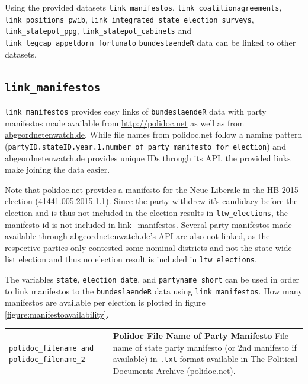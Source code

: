 \documentclass[
]{scrartcl}
\begin{document}
Using the provided datasets \texttt{link\_manifestos},
\texttt{link\_coalitionagreements}, \texttt{link\_positions\_pwib},
\texttt{link\_integrated\_state\_election\_surveys},
\texttt{link\_statepol\_ppg}, \texttt{link\_statepol\_cabinets} and
\texttt{link\_legcap\_appeldorn\_fortunato} \texttt{bundeslaendeR} data
can be linked to other datasets.

\subsection{\texorpdfstring{\texttt{link\_manifestos}}{link\_manifestos}}\label{link_manifestos}

\texttt{link\_manifestos} provides easy links of \texttt{bundeslaendeR}
data with party manifestos made available from \url{http://polidoc.net}
\parencites{benoitChallengesEstimatingPolicy2009}{grossDoesEURegional2018}{pappiPolitikpositionenDeutschenLandtagsparteien2014}{pappiPartyElectionProgrammes2009}[for the codebook see][]{brauningerPolidocnetCodebook2018}
as well as from \url{abgeordnetenwatch.de}. While file names from
polidoc.net follow a naming pattern
(\texttt{{partyID}.{stateID}.{year}.{1}.{number of party manifesto for election}})
and abgeordnetenwatch.de provides unique IDs through its API, the
provided links make joining the data easier.

Note that polidoc.net provides a manifesto for the Neue Liberale in the
HB 2015 election (41441.005.2015.1.1). Since the party withdrew it's
candidacy before the election and is thus not included in the election
results in \texttt{ltw\_elections}, the manifesto id is not included in
link\_manifestos. Several party manifestos made available through
abgeordnetenwatch.de's API are also not linked, as the respective
parties only contested some nominal districts and not the state-wide
list election and thus no election result is included in
\texttt{ltw\_elections}.

The variables \texttt{state}, \texttt{election\_date}, and
\texttt{partyname\_short} can be used in order to link manifestos to the
\texttt{bundeslaendeR} data using \texttt{link\_manifestos}. How many
manifestos are available per election is plotted in
figure\(~\)\ref{figure:manifestoavailability}.

\begin{longtable}{p{3.2cm}| p{11cm}}
\texttt{polidoc\_filename and polidoc\_filename\_2} &\textbf{Polidoc File Name of Party Manifesto}\newline 
File name of state party manifesto (or 2nd manifesto if available) in \texttt{.txt} format available in The Political Documents Archive (polidoc.net).
\end{longtable}
\end{document}
